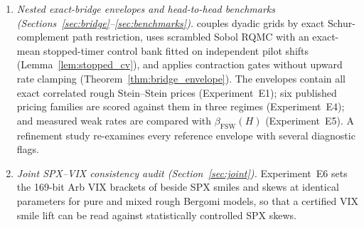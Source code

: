 \begin{enumerate}[1.]
  \item \emph{Nested exact-bridge envelopes and head-to-head benchmarks (Sections~\ref{sec:bridge}--\ref{sec:benchmarks}).} \RCBridge{} couples dyadic grids by exact Schur-complement path restriction, uses scrambled Sobol RQMC with an exact-mean stopped-timer control bank fitted on independent pilot shifts (Lemma~\ref{lem:stopped_cv}), and applies contraction gates without upward rate clamping (Theorem~\ref{thm:bridge_envelope}). The envelopes contain all exact correlated rough Stein--Stein prices \citep{AbiJaber2022} (Experiment~E1); six published pricing families \citep{McCrickerdPakkanen2018,BayerBenHammoudaTempone2020,BayerBreneis2023,HorvathJacquierMuguruza2024,BergomiGuyon2012,FrizSalkeldWagenhofer2025} are scored against them in three regimes (Experiment~E4); and measured weak rates are compared with $\beta_{\mathrm{FSW}}(H)$ (Experiment~E5). A refinement study re-examines every reference envelope with several diagnostic flags.
  \item \emph{Joint SPX--VIX consistency audit (Section~\ref{sec:joint}).} Experiment~E6 sets the 169-bit Arb VIX brackets of \citet{AhmedEtAl2026RoughCert} beside \RCBridge{} SPX smiles and skews at identical parameters for pure and mixed rough Bergomi models, so that a certified VIX smile lift can be read against statistically controlled SPX skews.
\end{enumerate}

